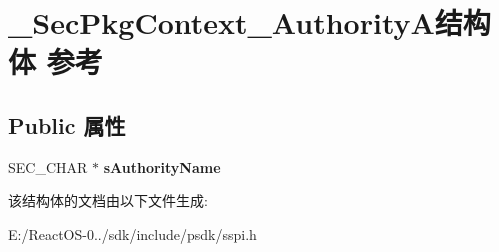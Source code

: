 \hypertarget{struct___sec_pkg_context___authority_a}{}\section{\+\_\+\+Sec\+Pkg\+Context\+\_\+\+Authority\+A结构体 参考}
\label{struct___sec_pkg_context___authority_a}
\subsection*{Public 属性}
\begin{DoxyCompactItemize}
\item 
\mbox{\label{struct___sec_pkg_context___authority_a_ac759ab42233d952329f8fde1a7972f2d}} 
S\+E\+C\+\_\+\+C\+H\+AR $\ast$ {\bfseries s\+Authority\+Name}
\end{DoxyCompactItemize}


该结构体的文档由以下文件生成\+:\begin{DoxyCompactItemize}
\item 
E\+:/\+React\+O\+S-\/0../sdk/include/psdk/sspi.\+h\end{DoxyCompactItemize}
